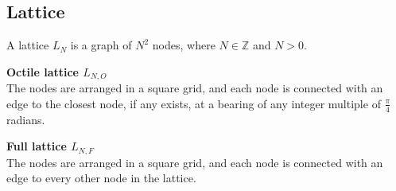 \documentclass[12pt,notitlepage]{report}
\begin{document}
\subsection{Lattice}

A lattice $L_{N}$ is a graph of $N^{2}$ nodes, where $N \in\mathbb{Z}$ and $N > 0$. 

\begin{description}
\item{\bfseries Octile lattice $L_{N,O}$}\\The nodes are arranged in a square grid, and each node is connected with an edge to the closest node, if any exists, at a bearing of any integer multiple of $\frac{\pi}{4}$ radians.

\item{\bfseries Full lattice $L_{N,F}$}\\The nodes are arranged in a square grid, and each node is connected with an edge to every other node in the lattice.
\end{description}
\end{document}
